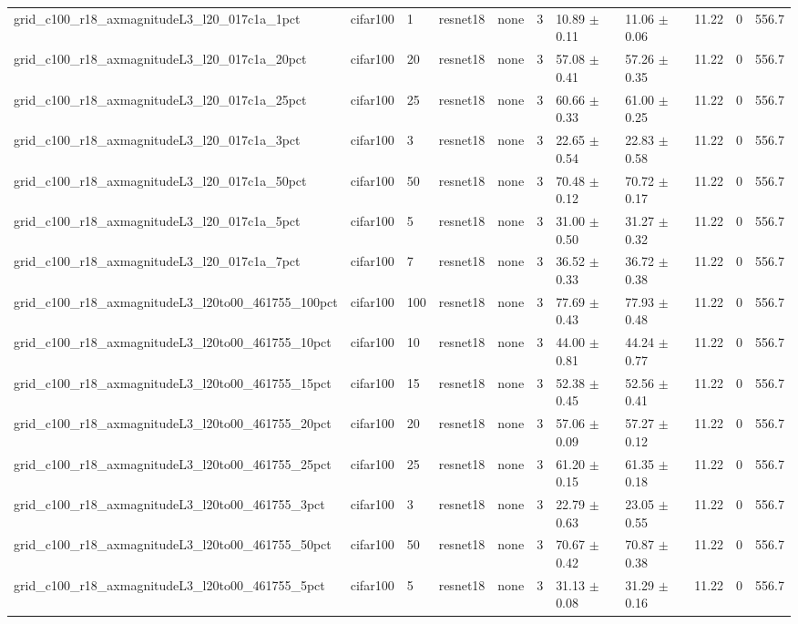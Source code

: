 \begin{tabular}{lllllllllll}
grid_c100_r18_axmagnitudeL3_l20_017c1a_1pct & cifar100 & 1 & resnet18 & none & 3 & 10.89 $\pm$ 0.11 & 11.06 $\pm$ 0.06 & 11.22 & 0 & 556.7 \\
grid_c100_r18_axmagnitudeL3_l20_017c1a_20pct & cifar100 & 20 & resnet18 & none & 3 & 57.08 $\pm$ 0.41 & 57.26 $\pm$ 0.35 & 11.22 & 0 & 556.7 \\
grid_c100_r18_axmagnitudeL3_l20_017c1a_25pct & cifar100 & 25 & resnet18 & none & 3 & 60.66 $\pm$ 0.33 & 61.00 $\pm$ 0.25 & 11.22 & 0 & 556.7 \\
grid_c100_r18_axmagnitudeL3_l20_017c1a_3pct & cifar100 & 3 & resnet18 & none & 3 & 22.65 $\pm$ 0.54 & 22.83 $\pm$ 0.58 & 11.22 & 0 & 556.7 \\
grid_c100_r18_axmagnitudeL3_l20_017c1a_50pct & cifar100 & 50 & resnet18 & none & 3 & 70.48 $\pm$ 0.12 & 70.72 $\pm$ 0.17 & 11.22 & 0 & 556.7 \\
grid_c100_r18_axmagnitudeL3_l20_017c1a_5pct & cifar100 & 5 & resnet18 & none & 3 & 31.00 $\pm$ 0.50 & 31.27 $\pm$ 0.32 & 11.22 & 0 & 556.7 \\
grid_c100_r18_axmagnitudeL3_l20_017c1a_7pct & cifar100 & 7 & resnet18 & none & 3 & 36.52 $\pm$ 0.33 & 36.72 $\pm$ 0.38 & 11.22 & 0 & 556.7 \\
grid_c100_r18_axmagnitudeL3_l20to00_461755_100pct & cifar100 & 100 & resnet18 & none & 3 & 77.69 $\pm$ 0.43 & 77.93 $\pm$ 0.48 & 11.22 & 0 & 556.7 \\
grid_c100_r18_axmagnitudeL3_l20to00_461755_10pct & cifar100 & 10 & resnet18 & none & 3 & 44.00 $\pm$ 0.81 & 44.24 $\pm$ 0.77 & 11.22 & 0 & 556.7 \\
grid_c100_r18_axmagnitudeL3_l20to00_461755_15pct & cifar100 & 15 & resnet18 & none & 3 & 52.38 $\pm$ 0.45 & 52.56 $\pm$ 0.41 & 11.22 & 0 & 556.7 \\
grid_c100_r18_axmagnitudeL3_l20to00_461755_20pct & cifar100 & 20 & resnet18 & none & 3 & 57.06 $\pm$ 0.09 & 57.27 $\pm$ 0.12 & 11.22 & 0 & 556.7 \\
grid_c100_r18_axmagnitudeL3_l20to00_461755_25pct & cifar100 & 25 & resnet18 & none & 3 & 61.20 $\pm$ 0.15 & 61.35 $\pm$ 0.18 & 11.22 & 0 & 556.7 \\
grid_c100_r18_axmagnitudeL3_l20to00_461755_3pct & cifar100 & 3 & resnet18 & none & 3 & 22.79 $\pm$ 0.63 & 23.05 $\pm$ 0.55 & 11.22 & 0 & 556.7 \\
grid_c100_r18_axmagnitudeL3_l20to00_461755_50pct & cifar100 & 50 & resnet18 & none & 3 & 70.67 $\pm$ 0.42 & 70.87 $\pm$ 0.38 & 11.22 & 0 & 556.7 \\
grid_c100_r18_axmagnitudeL3_l20to00_461755_5pct & cifar100 & 5 & resnet18 & none & 3 & 31.13 $\pm$ 0.08 & 31.29 $\pm$ 0.16 & 11.22 & 0 & 556.7 \\

\end{tabular}
